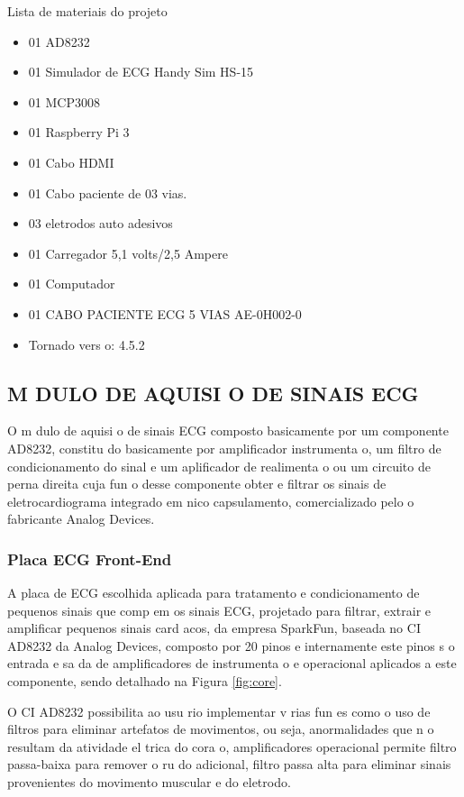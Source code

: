 \documentclass{article}
\begin{document}
Lista de materiais do projeto


\begin{itemize}
\item 01 AD8232
\item 01 Simulador de ECG Handy Sim HS-15
\item 01 MCP3008
\item 01 Raspberry Pi 3
\item 01 Cabo HDMI
\item 01 Cabo paciente de 03 vias.
\item 03 eletrodos auto adesivos
\item 01 Carregador 5,1 volts/2,5 Ampere
\item 01 Computador
\item 01 CABO PACIENTE ECG 5 VIAS AE-0H002-0
\item Tornado vers o: 4.5.2
\end{itemize}

\subsection{M DULO DE AQUISI O DE SINAIS ECG}
\hspace*{0.8cm} O m dulo de aquisi o de sinais ECG   composto basicamente por um componente AD8232, constitu do basicamente por amplificador  instrumenta o, um filtro de condicionamento do sinal e um aplificador de realimenta o ou um circuito de perna direita cuja fun o desse componente   obter e filtrar os sinais de eletrocardiograma integrado em  nico capsulamento, comercializado pelo o fabricante Analog Devices.

\subsubsection{Placa ECG Front-End}
\hspace*{0.8cm}A placa de ECG escolhida   aplicada para  tratamento e condicionamento de pequenos sinais que comp em os sinais  ECG, projetado para filtrar, extrair e amplificar pequenos sinais card acos,   da empresa SparkFun, baseada no CI AD8232 da Analog Devices,   composto por 20 pinos e internamente este pinos s o entrada e sa da de amplificadores de instrumenta o e operacional aplicados a este componente, sendo detalhado na Figura \ref{fig:core}.

O CI AD8232 possibilita ao usu rio implementar v rias fun es como o uso de filtros para eliminar artefatos de movimentos, ou seja, anormalidades que n o resultam da atividade el trica do cora o, amplificadores operacional permite filtro passa-baixa para remover o ru do adicional, filtro passa alta para eliminar sinais provenientes do movimento muscular e do eletrodo.
\end{document}
